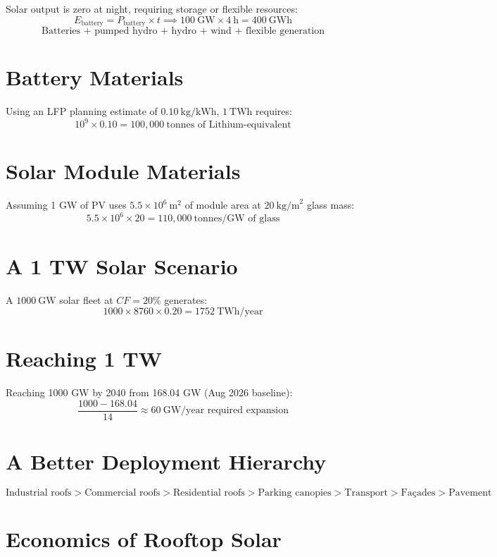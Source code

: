 \documentclass[11pt,a4paper]{article}
\begin{document}
Solar output is zero at night, requiring storage or flexible resources:
\[
E_{\text{battery}} = P_{\text{battery}} \times t \implies 100\ \text{GW} \times 4\ \text{h} = \boxed{400\ \text{GWh}}
\]
\[
\boxed{\text{Batteries + pumped hydro + hydro + wind + flexible generation}}
\]

\section{Battery Materials}

Using an LFP planning estimate of $0.10\ \text{kg/kWh}$, $1\ \text{TWh}$ requires:
\[
10^9 \times 0.10 = \boxed{100,000\ \text{tonnes of Lithium-equivalent}}
\]

\section{Solar Module Materials}

Assuming 1 GW of PV uses $5.5 \times 10^6\ \text{m}^2$ of module area at $20\ \text{kg/m}^2$ glass mass:
\[
5.5 \times 10^6 \times 20 = \boxed{110,000\ \text{tonnes/GW of glass}}
\]

\section{A 1 TW Solar Scenario}

A $1000\ \text{GW}$ solar fleet at $CF=20\%$ generates:
\[
1000 \times 8760 \times 0.20 = \boxed{1752\ \text{TWh/year}}
\]

\section{Reaching 1 TW}

Reaching 1000 GW by 2040 from 168.04 GW (Aug 2026 baseline):
\[
\frac{1000 - 168.04}{14} \approx \boxed{60\ \text{GW/year required expansion}}
\]

\section{A Better Deployment Hierarchy}

\[
\boxed{\text{Industrial roofs} > \text{Commercial roofs} > \text{Residential roofs} > \text{Parking canopies} > \text{Transport} > \text{Façades} > \text{Pavement}}
\]

\section{Economics of Rooftop Solar}
\end{document}
